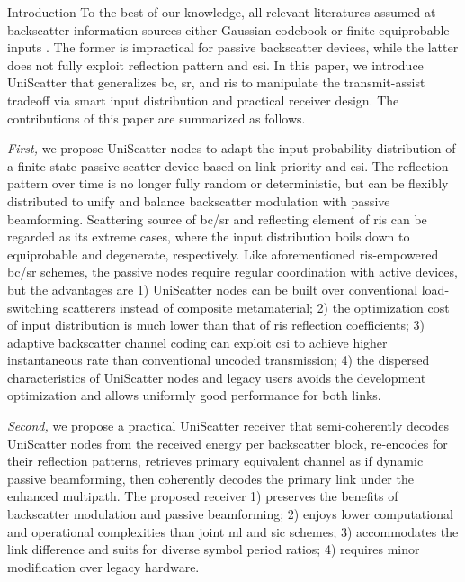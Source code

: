 \documentclass[journal]{IEEEtran}
\begin{document}
\begin{section}{Introduction}
	To the best of our knowledge, all relevant literatures assumed at backscatter information sources either Gaussian codebook \cite{Guo2019b,Ding2020,Long2020a,Zhou2019a,Wu2021a,Xu2021a,Yang2021a,Hu2021b} or finite equiprobable inputs \cite{Yang2018,Liang2020,Han2021,Zhang2022,Liu2019d,Bereyhi2020,Xu2020b,Zhang2021d,Hua2022,Basar2020,Ma2020a,Yuan2021,Hu2021a}.
	The former is impractical for passive backscatter devices, while the latter does not fully exploit reflection pattern and \gls{csi}.
	In this paper, we introduce UniScatter that generalizes \gls{bc}, \gls{sr}, and \gls{ris} to manipulate the transmit-assist tradeoff via smart input distribution and practical receiver design.
	The contributions of this paper are summarized as follows.

	\emph{First,} we propose UniScatter nodes to adapt the input probability distribution of a finite-state passive scatter device based on link priority and \gls{csi}.
	The reflection pattern over time is no longer fully random or deterministic, but can be flexibly distributed to unify and balance backscatter modulation with passive beamforming.
	Scattering source of \gls{bc}/\gls{sr} and reflecting element of \gls{ris} can be regarded as its extreme cases, where the input distribution boils down to equiprobable and degenerate, respectively.
	Like aforementioned \gls{ris}-empowered \gls{bc}/\gls{sr} schemes, the passive nodes require regular coordination with active devices, but the advantages are 1) UniScatter nodes can be built over conventional load-switching scatterers instead of composite metamaterial; 2) the optimization cost of input distribution is much lower than that of \gls{ris} reflection coefficients; 3) adaptive backscatter channel coding can exploit \gls{csi} to achieve higher instantaneous rate than conventional uncoded transmission; 4) the dispersed characteristics of UniScatter nodes and legacy users avoids the development optimization and allows uniformly good performance for both links.

	\emph{Second,} we propose a practical UniScatter receiver that semi-coherently decodes UniScatter nodes from the received energy per backscatter block, re-encodes for their reflection patterns, retrieves primary equivalent channel as if dynamic passive beamforming, then coherently decodes the primary link under the enhanced multipath.
	The proposed receiver 1) preserves the benefits of backscatter modulation and passive beamforming; 2) enjoys lower computational and operational complexities than joint \gls{ml} and \gls{sic} schemes; 3) accommodates the link difference and suits for diverse symbol period ratios; 4) requires minor modification over legacy hardware.


\end{section}
\end{document}
